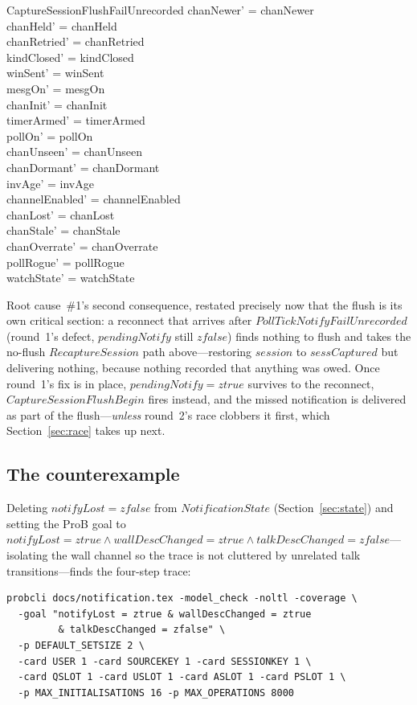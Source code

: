 \documentclass[a4paper,10pt,fleqn]{article}
\begin{document}
\begin{schema}{CaptureSessionFlushFailUnrecorded}
  chanNewer' = chanNewer \\
  chanHeld' = chanHeld \\
  chanRetried' = chanRetried \\
  kindClosed' = kindClosed \\
  winSent' = winSent \\
  mesgOn' = mesgOn \\
  chanInit' = chanInit \\
  timerArmed' = timerArmed \\
  pollOn' = pollOn \\
  chanUnseen' = chanUnseen \\
  chanDormant' = chanDormant \\
  invAge' = invAge \\
  channelEnabled' = channelEnabled \\
  chanLost' = chanLost \\
  chanStale' = chanStale \\
  chanOverrate' = chanOverrate \\
  pollRogue' = pollRogue \\
  watchState' = watchState
\end{schema}

Root cause~\#1's second consequence, restated precisely now that the
flush is its own critical section: a reconnect that arrives after
$PollTickNotifyFailUnrecorded$ (round~1's defect, $pendingNotify$ still
$zfalse$) finds nothing to flush and takes the no-flush
$RecaptureSession$ path above---restoring $session$ to $sessCaptured$
but delivering nothing, because nothing recorded that anything was
owed.  Once round~1's fix is in place, $pendingNotify = ztrue$ survives
to the reconnect, $CaptureSessionFlushBegin$ fires instead, and the
missed notification is delivered as part of the flush---\emph{unless}
round~2's race clobbers it first, which Section~\ref{sec:race} takes up
next.

\subsection{The counterexample}

Deleting $notifyLost = zfalse$ from $NotificationState$
(Section~\ref{sec:state}) and setting the ProB goal to
$notifyLost = ztrue \land wallDescChanged = ztrue \land talkDescChanged
= zfalse$---isolating the wall channel so the trace is not cluttered by
unrelated talk transitions---finds the four-step trace:

\begin{verbatim}
probcli docs/notification.tex -model_check -noltl -coverage \
  -goal "notifyLost = ztrue & wallDescChanged = ztrue
         & talkDescChanged = zfalse" \
  -p DEFAULT_SETSIZE 2 \
  -card USER 1 -card SOURCEKEY 1 -card SESSIONKEY 1 \
  -card QSLOT 1 -card USLOT 1 -card ASLOT 1 -card PSLOT 1 \
  -p MAX_INITIALISATIONS 16 -p MAX_OPERATIONS 8000
\end{verbatim}
\end{document}
